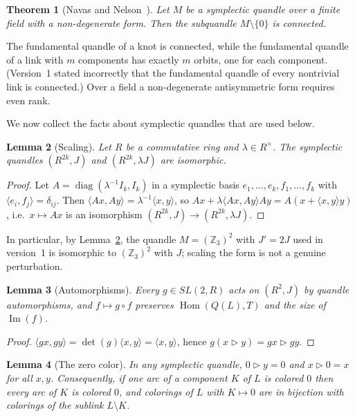 \documentclass[11pt]{article}
\newtheorem{theorem}{Theorem}[section]
\newtheorem{lemma}[theorem]{Lemma}
\theoremstyle{definition}
\newcommand{\Z}{\mathbb{Z}}
\newcommand{\Hom}{\operatorname{Hom}}
\renewcommand{\Im}{\operatorname{Im}}
\newcommand{\tr}{\triangleright}
\begin{document}
\begin{theorem}[Navas and Nelson~\cite{NN08}]
Let $M$ be a symplectic quandle over a finite field with a non-degenerate form. Then the subquandle
$M\setminus\{0\}$ is connected.
\end{theorem}

The fundamental quandle of a knot is connected, while the fundamental quandle of a link with $m$
components has exactly $m$ orbits, one for each component. (Version~1 stated incorrectly that the
fundamental quandle of every nontrivial link is connected.) Over a field a non-degenerate
antisymmetric form requires even rank.

We now collect the facts about symplectic quandles that are used below.

\begin{lemma}[Scaling]\label{lem:scaling}
Let $R$ be a commutative ring and $\lambda\in R^\times$. The symplectic quandles $(R^{2k},J)$ and
$(R^{2k},\lambda J)$ are isomorphic.
\end{lemma}

\begin{proof}
Let $A=\operatorname{diag}(\lambda^{-1}I_k,I_k)$ in a symplectic basis $e_1,\dots,e_k,f_1,\dots,f_k$ with
$\langle e_i,f_j\rangle=\delta_{ij}$. Then $\langle Ax,Ay\rangle=\lambda^{-1}\langle x,y\rangle$, so
$A x+\lambda\langle Ax,Ay\rangle Ay=A(x+\langle x,y\rangle y)$, i.e.\ $x\mapsto Ax$ is an isomorphism
$(R^{2k},J)\to(R^{2k},\lambda J)$.
\end{proof}

In particular, by Lemma~\ref{lem:scaling}, the quandle $M=(\Z_3)^2$ with $J'=2J$ used in version~1 is
isomorphic to $(\Z_3)^2$ with $J$; scaling the form is not a genuine perturbation.

\begin{lemma}[Automorphisms]\label{lem:sl2}
Every $g\in SL(2,R)$ acts on $(R^2,J)$ by quandle automorphisms, and $f\mapsto g\circ f$ preserves
$\Hom(Q(L),T)$ and the size of $\Im(f)$.
\end{lemma}

\begin{proof}
$\langle gx,gy\rangle=\det(g)\langle x,y\rangle=\langle x,y\rangle$, hence $g(x\tr y)=gx\tr gy$.
\end{proof}

\begin{lemma}[The zero color]\label{lem:zero}
In any symplectic quandle, $0\tr y=0$ and $x\tr0=x$ for all $x,y$. Consequently, if one arc of a
component $K$ of $L$ is colored $0$ then every arc of $K$ is colored $0$, and colorings of $L$ with
$K\mapsto 0$ are in bijection with colorings of the sublink $L\setminus K$.
\end{lemma}
\end{document}
